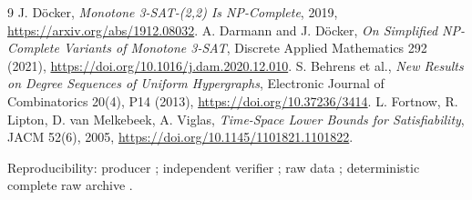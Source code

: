 \documentclass[11pt]{article}
\begin{document}
\begin{thebibliography}{9}
 J. D\"ocker, \emph{Monotone 3-SAT-(2,2) Is NP-Complete},
2019, \url{https://arxiv.org/abs/1912.08032}.
 A. Darmann and J. D\"ocker, \emph{On Simplified
NP-Complete Variants of Monotone 3-SAT}, Discrete Applied Mathematics 292
(2021), \url{https://doi.org/10.1016/j.dam.2020.12.010}.
 S. Behrens et al., \emph{New Results on Degree Sequences
of Uniform Hypergraphs}, Electronic Journal of Combinatorics 20(4), P14
(2013), \url{https://doi.org/10.37236/3414}.
 L. Fortnow, R. Lipton, D. van Melkebeek, A. Viglas,
\emph{Time-Space Lower Bounds for Satisfiability}, JACM 52(6), 2005,
\url{https://doi.org/10.1145/1101821.1101822}.
\end{thebibliography}

\noindent Reproducibility: producer
;
independent verifier
;
raw data
;
deterministic complete raw archive
.

\end{document}
